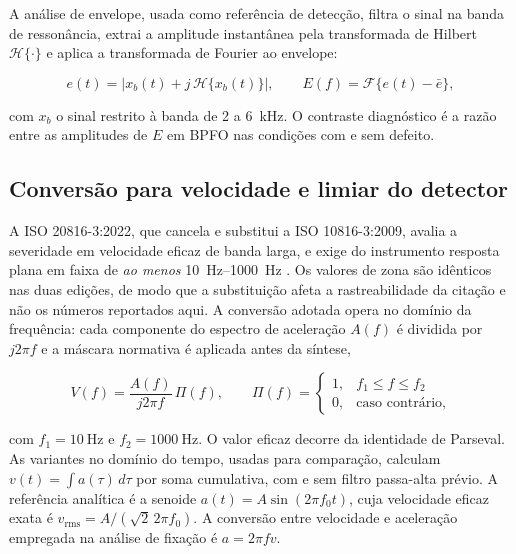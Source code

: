 \documentclass[11pt,a4paper]{article}
\begin{document}
A análise de envelope, usada como referência de detecção, filtra o sinal na banda de
ressonância, extrai a amplitude instantânea pela transformada de Hilbert
$\mathcal{H}\{\cdot\}$ e aplica a transformada de Fourier ao envelope:

\begin{equation}
e(t) = \left| x_b(t) + j\,\mathcal{H}\{x_b(t)\} \right|,
\qquad
E(f) = \mathcal{F}\{e(t) - \bar{e}\},
\label{eq:envelope}
\end{equation}

\noindent
com $x_b$ o sinal restrito à banda de \SI{2}{} a \SI{6}{\kilo\hertz}. O contraste
diagnóstico é a razão entre as amplitudes de $E$ em BPFO nas condições com e sem defeito.

\subsection{Conversão para velocidade e limiar do detector}
\label{ssec:conversao}

A ISO 20816-3:2022, que cancela e substitui a ISO 10816-3:2009, avalia a severidade em
velocidade eficaz de banda larga, e exige do instrumento resposta plana em faixa de
\emph{ao menos} \SIrange{10}{1000}{\hertz} \cite{iso10816,iso20816}. Os valores de
zona são idênticos nas duas edições, de modo que a substituição afeta a rastreabilidade da
citação e não os números reportados aqui.
A conversão adotada opera no domínio da frequência: cada componente do espectro de
aceleração $A(f)$ é dividida por $j2\pi f$ e a máscara normativa é aplicada antes da
síntese,

\begin{equation}
V(f) = \frac{A(f)}{j 2\pi f}\, \Pi(f),
\qquad
\Pi(f) = \begin{cases} 1, & f_1 \leq f \leq f_2 \\ 0, & \text{caso contrário,}\end{cases}
\label{eq:integracao}
\end{equation}

\noindent
com $f_1 = \SI{10}{\hertz}$ e $f_2 = \SI{1000}{\hertz}$. O valor eficaz decorre da
identidade de Parseval. As variantes no domínio do tempo, usadas para comparação,
calculam $v(t) = \int a(\tau)\,d\tau$ por soma cumulativa, com e sem filtro passa-alta
prévio. A referência analítica é a senoide $a(t) = A\sin(2\pi f_0 t)$, cuja velocidade
eficaz exata é $v_{\mathrm{rms}} = A/(\sqrt{2}\,2\pi f_0)$. A conversão entre velocidade
e aceleração empregada na análise de fixação é $a = 2\pi f v$.
\end{document}
